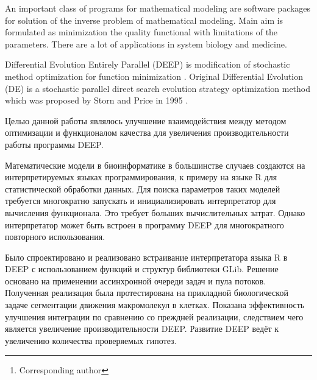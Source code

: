 \documentclass[12pt, a4paper]{article} %
\begin{document}

\renewcommand{\abstractname}{\large
    Method development of Differential Evolution
    for search mathematical model's options}
\begin{abstract}
    \normalsize %
    \bigskip %
    \noindent A.~V.~Svichkarev\footnote[*]{Corresponding author}, K.~N.~Kozlov \\
    \noindent Peter the Great St.Petersburg Polytechnic University,
St.Petersburg, Russia \\
    \noindent e-mail: svichkarev.anatoly@gmail.com \\
\end{abstract}

An important class of programs
for mathematical modeling are
software packages for solution
of the inverse problem of mathematical modeling.
Main aim is formulated as
minimization the quality functional
with limitations of the parameters.
There are a lot of applications
in system biology and medicine.

Differential Evolution Entirely Parallel (DEEP)
is modification of stochastic method optimization
for function minimization \cite{Kozlov11}.
Original Differential Evolution (DE)
is a stochastic parallel direct search
evolution strategy optimization method
which was proposed by Storn and Price in 1995 \cite{Storn95}. 

Целью данной работы являлось улучшение взаимодействия
между методом оптимизации
и функционалом качества
для увеличения производительности
работы программы DEEP.

Математические модели в биоинформатике
в большинстве случаев создаются
на интерпретируемых языках программирования,
к примеру на языке R для статистической обработки данных.
Для поиска параметров таких моделей
требуется многократно запускать
и инициализировать интерпретатор
для вычисления функционала.
Это требует больших вычислительных затрат.
Однако интерпретатор может быть встроен
в программу DEEP для
многократного повторного использования.

Было спроектировано и реализовано
встраивание интерпретатора языка R
в DEEP с использованием
функций и структур библиотеки GLib.
Решение основано на применении
ассинхронной очереди задач и пула потоков.
Полученная реализация была
протестирована на прикладной биологической задаче
сегментации движения макромолекул в клетках.
Показана эффективность улучшения интеграции
по сравнению со преждней реализации,
следствием чего является
увеличение производительности DEEP.
Развитие DEEP ведёт к увеличению
количества проверяемых гипотез.

\vfill %
\end{document}
